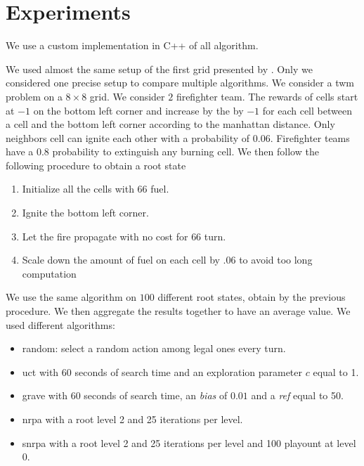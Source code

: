 \section{Experiments}%
\label{sec:experiments}

We use a custom implementation in C++ of all algorithm.

We used almost the same setup of the first grid presented by \citeauthor{comp_mcts_mo}\cite{comp_mcts_mo}.
Only we considered one precise setup to compare multiple algorithms.
We consider a \gls{twm} problem on a \(8 \times 8\) grid. 
We consider \(2\) firefighter team.
The rewards of cells start at \(-1\) on the bottom left corner and increase by the by \(-1\) for each cell between a cell and the bottom left corner according to the manhattan distance.
Only neighbors cell can ignite each other with a probability of \(0.06\).
Firefighter teams have a \(0.8\) probability to extinguish any burning cell.
We then follow the following procedure to obtain a root state

\begin{enumerate}
    \item Initialize all the cells with \(66\) fuel. 
    \item Ignite the bottom left corner.
    \item Let the fire propagate with no cost for \(66\) turn.
    \item Scale down the amount of fuel on each cell by \(.06\) to avoid too long computation
\end{enumerate}

We use the same algorithm on \(100\) different root states, obtain by the previous procedure.
We then aggregate the results together to have an average value.
We used different algorithms:

\begin{itemize}
    \item random: select a random action among legal ones every turn.
    \item \gls{uct} with \(60\) seconds of search time and an exploration parameter \(c\) equal to 1.
    \item \gls{grave} with 60 seconds of search time, an \textit{bias}  of \(0.01\) and a \textit{ref} equal to 50.
    \item \gls{nrpa} with a root level 2 and 25 iterations per level.
    \item \gls{snrpa} with a root level 2 and 25 iterations per level and 100 playount at level 0.
\end{itemize}

